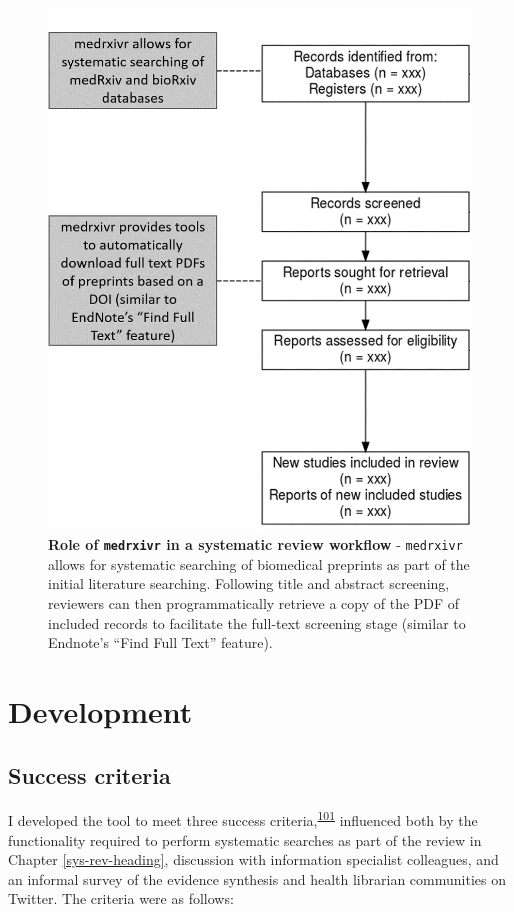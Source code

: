\documentclass[a4paper, twoside]{templates/ociamthesis}
\begin{document}
\begin{figure}

{\centering \includegraphics[width=0.65\linewidth]{figures/sys-rev-tools/medrxiv-role} 

}

\caption[Role of \texttt{medrxivr} in a systematic review workflow]{\textbf{Role of \texttt{medrxivr} in a systematic review workflow} - \texttt{medrxivr} allows for systematic searching of biomedical preprints as part of the initial literature searching. Following title and abstract screening, reviewers can then programmatically retrieve a copy of the PDF of included records to facilitate the full-text screening stage (similar to Endnote's ``Find Full Text'' feature).}\label{fig:medrxivr-sr}
\end{figure}

\hypertarget{development}{%
\section{Development}\label{development}}

\hypertarget{success-criteria}{%
\subsection{Success criteria}\label{success-criteria}}

I developed the tool to meet three success criteria,\textsuperscript{\protect\hyperlink{ref-wateridge1995}{101}} influenced both by the functionality required to perform systematic searches as part of the review in Chapter \ref{sys-rev-heading}, discussion with information specialist colleagues, and an informal survey of the evidence synthesis and health librarian communities on Twitter. The criteria were as follows:
\end{document}
